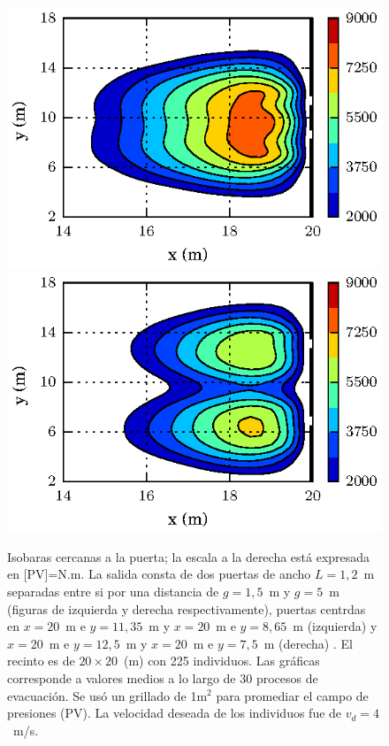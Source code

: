 \begin{figure}[H]
    \centering
    \includegraphics[scale=1.17]{figuras/isobaras_g1_5.eps}
    \hfill
        \includegraphics[scale=1.17]{figuras/isobaras_g5.eps}	
    \caption[width=5cm]{Isobaras cercanas a la puerta; la escala a la derecha está expresada en [PV]=N.m. La salida consta de dos puertas de ancho $L=1,2$~m separadas entre si por una distancia de $g=1,5$~m y $g=5$~m (figuras de izquierda y derecha respectivamente), puertas centrdas en $x=20$~m e $y=11,35$~m y $x=20$~m e $y=8,65$~m (izquierda) y $x=20$~m e $y=12,5$~m y $x=20$~m e $y=7,5$~m (derecha) . El recinto es de $20\times 20$~(m) con 225 individuos. Las gráficas corresponde a valores medios a lo largo de 30 procesos de evacuación. Se usó un grillado de 1m$^2$ para promediar el campo de presiones (PV). La velocidad deseada de los individuos fue de $v_d=4$~m/s.}
    \label{presion_225p_g1_5_y_5}
\end{figure}

